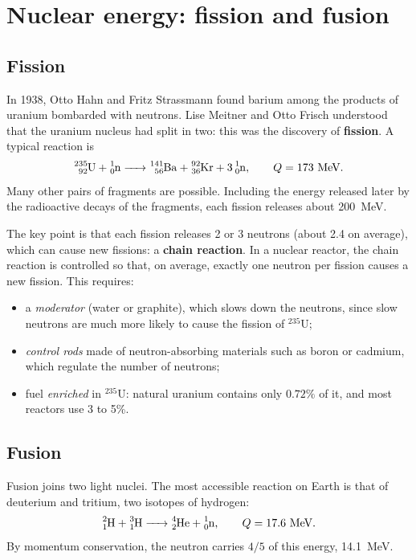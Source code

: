 \documentclass[11pt,a4paper]{article}
\newcommand{\iso}[2]{\ensuremath{{}^{#1}\mathrm{#2}}}         %
\begin{document}
\section{Nuclear energy: fission and fusion}

\subsection{Fission}

In 1938, Otto Hahn and Fritz Strassmann found barium among the products of uranium bombarded with neutrons. Lise Meitner and Otto Frisch understood that the uranium nucleus had split in two: this was the discovery of \textbf{fission}. A typical reaction is
\[
\ce{^{235}_{92}U + ^{1}_{0}n -> ^{141}_{56}Ba + ^{92}_{36}Kr + 3 ^{1}_{0}n}, \qquad Q = 173~\text{MeV}.
\]
Many other pairs of fragments are possible. Including the energy released later by the radioactive decays of the fragments, each fission releases about 200~MeV.

The key point is that each fission releases 2 or 3 neutrons (about 2.4 on average), which can cause new fissions: a \textbf{chain reaction}. In a nuclear reactor, the chain reaction is controlled so that, on average, exactly one neutron per fission causes a new fission. This requires:
\begin{itemize}
  \item a \emph{moderator} (water or graphite), which slows down the neutrons, since slow neutrons are much more likely to cause the fission of \iso{235}{U};
  \item \emph{control rods} made of neutron-absorbing materials such as boron or cadmium, which regulate the number of neutrons;
  \item fuel \emph{enriched} in \iso{235}{U}: natural uranium contains only $0.72\%$ of it, and most reactors use 3 to 5\%.
\end{itemize}

\subsection{Fusion}

Fusion joins two light nuclei. The most accessible reaction on Earth is that of deuterium and tritium, two isotopes of hydrogen:
\[
\ce{^{2}_{1}H + ^{3}_{1}H -> ^{4}_{2}He + ^{1}_{0}n}, \qquad Q = 17.6~\text{MeV}.
\]
By momentum conservation, the neutron carries $4/5$ of this energy, 14.1~MeV.
\end{document}
